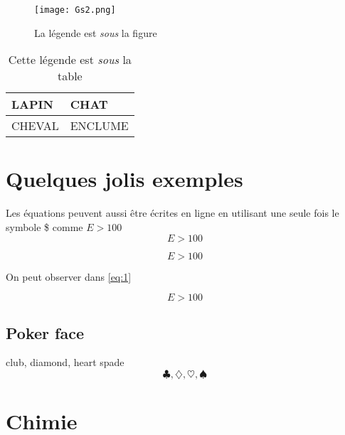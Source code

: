 \documentclass[twocolumn,a4paper]{IEEEtranfr}
\begin{document}
{\begin{verbatim}
\end{verbatim}

\begin{comment}
Ceci est un commentaire. Tout ce qui est écrit ici
n’apparaîtra pas dans le document final. 
Cela peut être un lieu de discussion sur le contenu.  
ne sera pas visible dans le document final 
\end{comment}

\begin{figure}[htbp]
\begin{centering}
\par
\texttt{[image: Gs2.png]}
\caption{La légende est \emph{sous} la figure}
\end{centering}
\end{figure}
%



\begin{table}[htb]
\centering{}
\begin{tabular}{|l|l|}
\hline 
LAPIN & CHAT \\
\hline
CHEVAL  & ENCLUME \\
\hline
\end{tabular}
\caption{Cette légende  est \emph{sous} la table}
\label{tab:animaux}
\end{table}
 
\section{Quelques jolis exemples}

Les équations peuvent aussi être écrites en ligne en utilisant une seule fois le symbole \$ comme $E>100$ $$E>100$$

\begin{equation}
E >100
\label{eq:1}
\end{equation}

On peut observer dans \ref{eq:1}}
\begin{equation*}
E >100
\end{equation*}

\subsection{Poker face}

club, diamond, heart spade
$$\clubsuit, \diamondsuit, \heartsuit ,\spadesuit$$
\section{Chimie}
\end{document}
